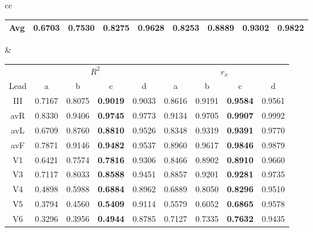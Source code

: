 \begin{table}[t!]
\begin{center}
\begin{tabular}{cc}
{\begin{footnotesize}
\begin{tabular}{|c|cccc|cccc|}
\hline

Avg & 0.6703 & 0.7530 & \textbf{0.8275} & 0.9628 & 0.8253  & 0.8889 & \textbf{0.9302} & 0.9822 \\

\hline
\end{tabular}
\label{incart_results}
\end{footnotesize}
}
&
{
\begin{footnotesize}
\begin{tabular}{|c|cccc|cccc|}
\hline

\cline{2-9}
& \multicolumn{4}{c|}{$R^2$}
& \multicolumn{4}{c|}{$r_x$} \\
\cline{2-9}

Lead & a & b & c & d & a & b & c & d \\
\hline
III & 0.7167 & 0.8075 & \textbf{0.9019} & 0.9033 & 0.8616 & 0.9191 & \textbf{0.9584} & 0.9561
  \\

avR & 0.8330 & 0.9406 & \textbf{0.9745} & 0.9773 & 0.9134 & 0.9705 & \textbf{0.9907} & 0.9992
  \\

avL & 0.6709 & 0.8760 & \textbf{0.8810} & 0.9526 & 0.8348 & 0.9319 & \textbf{0.9391} & 0.9770
  \\

avF & 0.7871 & 0.9146 & \textbf{0.9482} & 0.9537 & 0.8960 & 0.9617 & \textbf{0.9846} & 0.9879
  \\

V1 & 0.6421 & 0.7574 & \textbf{0.7816} & 0.9306 & 0.8466 & 0.8902 & \textbf{0.8910} & 0.9660
  \\

V3 & 0.7117 & 0.8033 & \textbf{0.8588} & 0.9451 & 0.8857 & 0.9201 & \textbf{0.9281} & 0.9735
  \\

V4 & 0.4898 & 0.5988 & \textbf{0.6884} & 0.8962 & 0.6889 & 0.8050 & \textbf{0.8296} & 0.9510
  \\

V5 & 0.3794 & 0.4560 & \textbf{0.5409} & 0.9114 & 0.5579 & 0.6052 & \textbf{0.6865} & 0.9578
  \\

V6 & 0.3296 & 0.3956 & \textbf{0.4944} & 0.8785 & 0.7127 & 0.7335 & \textbf{0.7632} & 0.9435
  \\

\hline


\end{tabular}
\end{footnotesize}}
\end{tabular}
\end{center}
\end{table}
